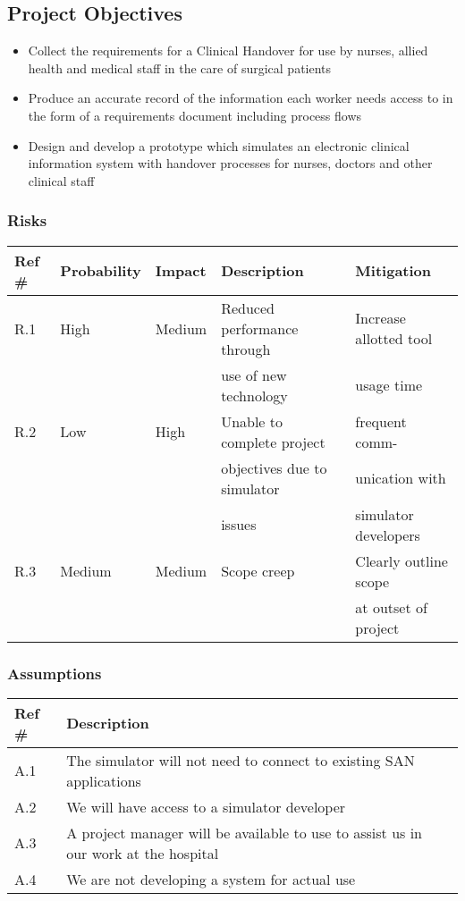 \newpage
\subsection{Project Objectives}
\label{Project Objectives}
\begin{itemize}
\item Collect the requirements for a Clinical Handover for use by nurses, allied health and medical staff in the care of surgical patients
\item Produce an accurate record of the information each worker needs access to in the form of a requirements document including process flows
\item Design and develop a prototype which simulates an electronic clinical information system with handover processes for nurses, doctors and other clinical staff
\end{itemize}

\subsubsection{Risks}

\begin{tabular}{|l|l|l|l|l|}
\hline
{\bf Ref \#} & {\bf Probability} & {\bf Impact} & {\bf Description} & {\bf Mitigation} \\
\hline
R.1 & High & Medium & Reduced performance through & Increase allotted tool  \\ & & & use of new technology & usage time  \\ 
\hline
R.2 & Low & High & Unable to complete project  & frequent comm- \\ & & & objectives due to simulator & unication with \\ & & & issues & simulator developers  \\  
\hline
R.3 & Medium & Medium & Scope creep & Clearly outline scope \\ & & & &  at outset of project \\
\hline
\end{tabular}

\subsubsection{Assumptions}

\begin{tabular}{|l|l|l|}
\hline
{\bf Ref \#} & {\bf Description} \\
\hline
A.1 & The simulator will not need to connect to existing SAN applications \\
\hline
A.2 & We will have access to a simulator developer \\
\hline
A.3 & A project manager will be available to use to assist us in our work at the hospital \\ 
\hline
A.4 & We are not developing a system for actual use \\
\hline
\end{tabular}

